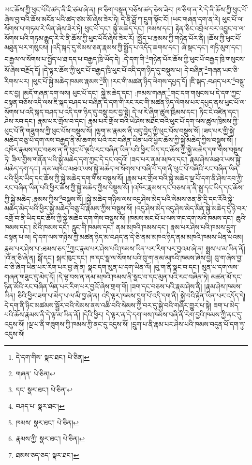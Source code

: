 ཡང་ཆོས་ཀྱི་ཕུང་པོའི་ཚད་ནི་ཇི་ཙམ་ཞེ་ན། ཁ་ཅིག་བསྟན་བཅོས་ཚད་ཅེས་ཟེར། ཁ་ཅིག་ན་རེ་དེ་ནི་ཆོས་ཀྱི་ཕུང་པོ་ཞེས་བྱ་བའི་ཆོས་མངོན་པའི་ཚད་ཙམ་མོ་ཞེས་ཟེར་ཏེ། དེ་ནི་ཤློ་ཀ་དྲུག་སྟོང་ངོ། །ཡང་གཞན་དག་ན་རེ། ཕུང་པོ་ལ་སོགས་པ་གཏམ་རེ་ཡིན་ཞེས་ཟེར་ཏེ། ཕུང་པོ་དང་། སྐྱེ་མཆེད་དང་། ཁམས་དང་། རྟེན་ཅིང་འབྲེལ་བར་འབྱུང་བ་ལ་སོགས་པའི་གཏམ་རྒྱུད་རེ་རེ་ནི་ཆོས་ཀྱི་ཕུང་པོའོ་ཞེས་ཟེར་རོ། །སྤྱོད་པ་རྣམས་ཀྱི་གཉེན་པོར་ནི། །ཆོས་ཀྱི་ཕུང་པོ་མཐུན་པར་གསུངས། །འདི་སྐད་དུ་སེམས་ཅན་རྣམས་ཀྱི་སྤྱོད་པ་འདོད་ཆགས་དང་། ཞེ་སྡང་དང་། གཏི་མུག་དང་། ང་རྒྱལ་ལ་སོགས་པ་སྤྱོད་པ་ཐ་དད་པ་བརྒྱད་ཁྲི་ཡོད་དེ། :དེ་དག་གི་\footnote{དེ་དག་གིས་  སྣར་ཐང་།  པེ་ཅིན། }གཉེན་པོར་ཆོས་ཀྱི་ཕུང་པོ་བརྒྱད་ཁྲི་གསུངས་སོ་ཞེས་བརྗོད་དོ། །དེ་ལྟར་ཆོས་ཀྱི་ཕུང་པོ་བརྒྱད་ཁྲི་ཕུང་པོ་འདི་དག་ཉིད་དུ་བསྡུས་པ། དེ་བཞིན་\footnote{གཞན་  པེ་ཅིན། }གཞན་ཡང་ཅི་རིགས་པར། །ཕུང་པོ་སྐྱེ་མཆེད་ཁམས་རྣམས་\footnote{དང་  སྣར་ཐང་།  པེ་ཅིན། }ནི། །རང་གི་མཚན་ཉིད་ལེགས་དཔྱད་དོ། །ཇི་སྐད་:བཤད་པར་\footnote{བཤད་པ་  སྣར་ཐང་། }བསྡུ་བར་བྱ། །མདོ་གཞན་དག་ལས། ཕུང་པོ་དང་། སྐྱེ་མཆེད་དང་། :ཁམས་གཞན་\footnote{ཁམས་  སྣར་ཐང་།  པེ་ཅིན། }གང་དག་གསུངས་པ་དེ་དག་ཀྱང་བསྟན་བཅོས་འདི་ལས་ཇི་སྐད་བཤད་པ་བཞིན་དེ་དག་གི་རང་རང་གི་མཚན་ཉིད་ལེགས་པར་དཔྱད་ནས་ཕུང་པོ་ལ་སོགས་པ་འདི་སྐད་བཤད་པ་འདི་དག་ཉིད་དུ་བསྡུ་བར་བྱ་སྟེ། དེ་ལ་རེ་ཞིག་ཚུལ་ཁྲིམས་དང་། ཏིང་ངེ་འཛིན་དང་། ཤེས་རབ་དང་། རྣམ་པར་གྲོལ་བ་དང་། རྣམ་པར་གྲོལ་བའི་ཡེ་ཤེས་མཐོང་བའི་ཕུང་པོ་དག་ལས་ཚུལ་ཁྲིམས་ཀྱི་ཕུང་པོ་ནི་གཟུགས་ཀྱི་ཕུང་པོས་བསྡུས་སོ། །ལྷག་མ་རྣམས་ནི་འདུ་བྱེད་ཀྱི་ཕུང་པོས་བསྡུས་སོ། །ཟད་པར་གྱི་སྐྱེ་མཆེད་བཅུ་པོ་དག་ལས་བརྒྱད་ནི་མ་ཆགས་པའི་རང་བཞིན་ཡིན་པའི་ཕྱིར་ཆོས་ཀྱི་སྐྱེ་མཆེད་ཀྱིས་བསྡུས་སོ། །འཁོར་རྣམས་དང་བཅས་ན་ནི་ཕུང་པོ་ལྔའི་རང་བཞིན་ཡིན་པའི་ཕྱིར་ཡིད་དང་ཆོས་ཀྱི་སྐྱེ་མཆེད་དག་གིས་བསྡུས་ཏེ། ཟིལ་གྱིས་གནོན་པའི་སྐྱེ་མཆེད་དག་ཀྱང་དེ་དང་འདྲའོ། །ཟད་པར་ནམ་མཁའ་དང་། རྣམ་ཤེས་མཐའ་ཡས་སྐྱེ་མཆེད་དག་དང་། ནམ་མཁའ་མཐའ་ཡས་སྐྱེ་མཆེད་ལ་སོགས་པ་བཞི་པོ་དག་ནི་ཕུང་པོ་བཞིའི་རང་བཞིན་ཡིན་པའི་ཕྱིར་ཡིད་དང་ཆོས་ཀྱི་སྐྱེ་མཆེད་དག་གིས་བསྡུས་སོ། །རྣམ་པར་གྲོལ་བའི་སྐྱེ་མཆེད་ལྔ་པོ་དག་ནི་ཤེས་རབ་ཀྱི་རང་བཞིན་ཡིན་པའི་ཕྱིར་ཆོས་ཀྱི་སྐྱེ་མཆེད་ཀྱིས་བསྡུས་སོ། །འཁོར་རྣམས་དང་བཅས་ན་ནི་སྒྲ་དང་ཡིད་དང་ཆོས་ཀྱི་སྐྱེ་མཆེད་:རྣམས་ཀྱིས་\footnote{རྣམས་ཀྱི་  སྣར་ཐང་།  པེ་ཅིན། }བསྡུས་སོ། །སྐྱེ་མཆེད་གཉིས་ལས་འདུ་ཤེས་མེད་པའི་སེམས་ཅན་ནི་དྲི་དང་རོའི་སྐྱེ་མཆེད་མེད་པའི་ཕྱིར་སྐྱེ་མཆེད་བཅུ་པོ་རྣམས་ཀྱིས་བསྡུས་སོ། །འདུ་ཤེས་མེད་འདུ་ཤེས་མེད་མིན་སྐྱེ་མཆེད་དུ་ཉེ་བར་འགྲོ་བ་ནི་ཡིད་དང་ཆོས་ཀྱི་སྐྱེ་མཆེད་དག་གིས་བསྡུས་སོ། །ཁམས་མང་པོ་པ་ལས་གང་དག་སའི་ཁམས་དང་། ཆུའི་ཁམས་དང་། མེའི་ཁམས་དང་། རླུང་གི་ཁམས་དང་། ནམ་མཁའི་ཁམས་དང་། རྣམ་པར་ཤེས་པའི་ཁམས་དྲུག་བསྟན་པ་ལ། དེ་དག་ལས་གཉིས་ཀྱི་མཚན་ཉིད་མ་བཤད་ན་དེ་ཅི་ནམ་མཁའ་ཉིད་ནམ་མཁའི་ཁམས་ཡིན་པའམ། རྣམ་པར་ཤེས་པ་:ཐམས་ཅད་\footnote{ཐམས་ཅད་ཅད་  སྣར་ཐང་། }ཀྱང་རྣམ་པར་ཤེས་པའི་ཁམས་ཡིན་པར་རིག་པར་བྱའམ་ཞེ་ན། སྨྲས་པ་མ་ཡིན་ནོ། །འོ་ན་ཅི་ཞེ་ན། སྒོ་དང་། སྐར་ཁུང་དང་། ཁ་དང་སྣ་ལ་སོགས་པའི་བུ་ག་ནམ་མཁའི་ཁམས་ཞེས་བྱ། བུ་ག་ཞེས་བྱ་བ་ཅི་ཞིག་ཡིན་པར་རིག་པར་བྱ་ཞེ་ན། སྣང་དག་མུན་པ་དག་ཡིན་ལོ། །བུ་ག་ནི་སྣང་བ་དང་། མུན་པ་དག་ལས་གཞན་གཟུང་དུ་མེད་དོ། །དེ་ལྟ་བས་ན་ནམ་མཁའི་ཁམས་ནི་སྣང་བ་དང་མུན་པའི་རང་བཞིན་ཏེ། མཚན་མོ་དང་ཉིན་མོའི་རང་བཞིན་ཡིན་པར་རིག་པར་བྱའོ་ཞེས་གྲག་གོ། །ཟག་དང་བཅས་པའི་རྣམ་ཤེས་ནི། །རྣམ་ཤེས་ཁམས་ཡིན། ཅིའི་ཕྱིར་ཟག་པ་མེད་པ་ལ་མི་བྱ་ཞེ་ན། འདི་ལྟར་ཁམས་དྲུག་པོ་འདི་དག་ནི། སྐྱེ་བའི་རྟེན་ཡིན་པར་འདོད་དེ། དེ་དག་ནི་ཉིང་མཚམས་སྦྱོར་བའི་སེམས་ནས་འཆི་བའི་སེམས་ཀྱི་བར་དུ་སྐྱེ་བའི་གཞིར་གྱུར་པ་སྟེ། ཟག་པ་མེད་པའི་ཆོས་རྣམས་ནི་དེ་ལྟ་མ་ཡིན་ནོ། །དེའི་ཕྱིར། དེ་ལྟར་ན་དེ་དག་ལས་ཁམས་བཞི་ནི་རེག་བྱའི་ཁམས་ཀྱི་ནང་དུ་འདུས་སོ། །ལྔ་པ་ནི་གཟུགས་ཀྱི་ཁམས་ཀྱི་ནང་དུ་འདུས་སོ། །དྲུག་པ་ནི་རྣམ་པར་ཤེས་པའི་ཁམས་བདུན་པོ་དག་ཏུ་འདུས་སོ། 